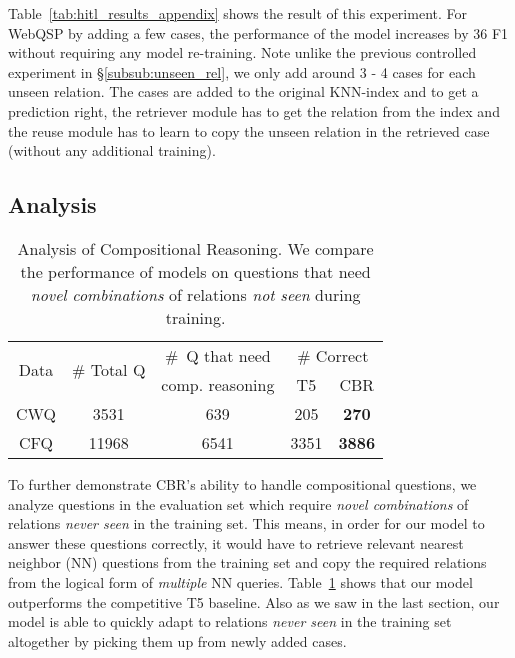 \documentclass{article}
\begin{document}
Table~\ref{tab:hitl_results_appendix} shows the result of this experiment. For WebQSP by adding a few cases, the performance of the model increases by 36 F1 without requiring any model re-training. Note unlike the previous controlled experiment in \S\ref{subsub:unseen_rel}, we only add around 3 - 4 cases for each unseen relation. The cases are added to the original KNN-index and to get a prediction right, the retriever module has to get the relation from the index and the reuse module has to learn to copy the unseen relation in the retrieved case (without any additional training). 

\subsection{Analysis}
\label{sub:analysis}

\begin{table}[]
\vspace{-1mm}
    \centering
    \small
    \begin{tabular}{c | c c | c c}\toprule
        \multirow{2}{*}{Data} & \multirow{2}{*}{\# Total Q} & \#\, Q that need & \multicolumn{2}{c}{\# Correct}\\
        & & comp. reasoning & T5 & CBR \\\midrule
        CWQ & 3531 & 639 & 205 & \textbf{270}\\
        CFQ & 11968 & 6541 & 3351 & \textbf{3886}\\\bottomrule
\end{tabular}
    \vspace{-2mm}
    \caption{\small Analysis of Compositional Reasoning. We compare the performance of models on questions that need \emph{novel combinations} of relations \emph{not seen} during training.}
    \vspace{-6mm}
    \label{tab:comp}
\end{table}

To further demonstrate CBR's ability to handle compositional questions, we analyze questions in the evaluation set which require \emph{novel combinations} of relations \emph{never seen} in the training set. This means, in order for our model to answer these questions correctly, it would have to retrieve relevant nearest neighbor (NN) questions from the training set and copy the required relations from  the logical form of \emph{multiple} NN queries. Table~\ref{tab:comp} shows that our model outperforms the competitive T5 baseline. Also as we saw in the last section, our model is able to quickly adapt to relations \emph{never seen} in the training set altogether by picking them up from newly added cases.
\end{document}
